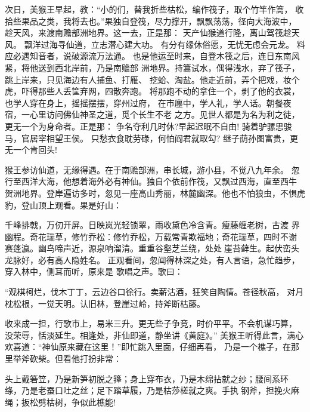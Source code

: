 次日，美猴王早起，教：“小的们，替我折些枯松，编作筏子，取个竹竿作篙，
收拾些果品之类，我将去也。”果独自登筏，尽力撑开，飘飘荡荡，径向大海波中，
趁天风，来渡南赡部洲地界。这一去，正是那：
天产仙猴道行隆，离山驾筏趁天风。
飘洋过海寻仙道，立志潜心建大功。
有分有缘休俗愿，无忧无虑会元龙。
料应必遇知音者，说破源流万法通。
也是他运至时来，自登木筏之后，连日东南风紧，将他送到西北岸前，乃是南赡部
洲地界。持篙试水，偶得浅水，弃了筏子，跳上岸来，只见海边有人捕鱼、打雁、
挖蛤、淘盐。他走近前，弄个把戏，妆个虎，吓得那些人丢筐弃网，四散奔跑。
将那跑不动的拿住一个，剥了他的衣裳，也学人穿在身上，摇摇摆摆，穿州过府，
在市廛中，学人礼，学人话。朝餐夜宿，一心里访问佛仙神圣之道，觅个长生不老
之方。见世人都是为名为利之徒，更无一个为身命者。正是那：
争名夺利几时休?早起迟眠不自由!
骑着驴骡思骏马，官居宰相望王侯。
只愁衣食耽劳碌，何怕阎君就取勾?
继子荫孙图富贵，更无一个肯回头!

猴王参访仙道，无缘得遇。在于南赡部洲，串长城，游小县，不觉八九年余。
忽行至西洋大海，他想着海外必有神仙。独自个依前作筏，又飘过西海，直至西牛
贺洲地界。登岸遍访多时，忽见一座高山秀丽，林麓幽深。他也不怕狼虫，不惧虎
豹，登山顶上观看。果是好山：

千峰排戟，万仞开屏。日映岚光轻锁翠，雨收黛色冷含青。瘦藤缠老树，古渡
界幽程。奇花瑞草，修竹乔松：修竹乔松，万载常青欺福地；奇花瑞草，四时不谢
赛蓬瀛。幽鸟啼声近，源泉响溜清。重重谷壑芝兰绕，处处崖苔藓生。起伏峦头
龙脉好，必有高人隐姓名。
正观看间，忽闻得林深之处，有人言语，急忙趋步，穿入林中，侧耳而听，原来是
歌唱之声。歌曰：

“观棋柯烂，伐木丁丁，云边谷口徐行。卖薪沽酒，狂笑自陶情。苍径秋高，
对月枕松根，一觉天明。认旧林，登崖过岭，持斧断枯藤。

收来成一担，行歌市上，易米三升。更无些子争竞，时价平平。不会机谋巧算，
没荣辱，恬淡延生。相逢处，非仙即道，静坐讲《黄庭》。”
美猴王听得此言，满心欢喜道：“神仙原来藏在这里！”即忙跳入里面，仔细再看，
乃是一个樵子，在那里举斧砍柴。但看他打扮非常：

头上戴箬笠，乃是新笋初脱之箨；身上穿布衣，乃是木绵拈就之纱；腰间系环
绦，乃是老蚕口吐之丝；足下踏草履，乃是枯莎槎就之爽。手执钢斧，担挽火麻
绳；扳松劈枯树，争似此樵能!

